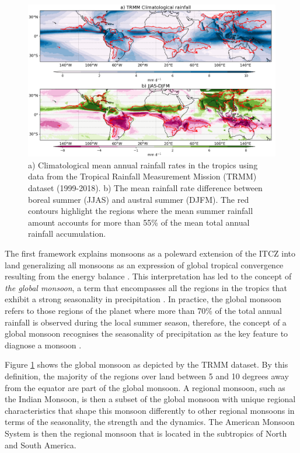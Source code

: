 \begin{figure}[b!]
\includegraphics[width=\linewidth]{figures/trmmclima.png}
\caption[The global monsoon rainfall]{a) Climatological mean annual rainfall rates in the tropics using data from the Tropical Rainfall Measurement Mission (TRMM) dataset (1999-2018). b) The mean rainfall rate difference between boreal summer (JJAS) and austral summer (DJFM). The red contours highlight the regions where the mean summer rainfall amount accounts for more than 55\% of the mean total annual rainfall accumulation. }
\label{fig:monsoon}
\end{figure}


The first framework  explains monsoons as a poleward extension of the ITCZ into land  generalizing all monsoons as an expression of global tropical convergence resulting from the energy balance \citep{chao2001origin,gadgil2018}. This interpretation has led to the concept of \textit{the global monsoon}, a term that encompasses all the regions in the tropics that exhibit a strong seasonality in precipitation \citep{zhou2016,gadgil2018}. 
In practice, the global monsoon refers to those regions of the planet where more than 70\% of the total annual rainfall is observed during the local summer season, therefore, the concept of a global monsoon recognises the seasonality of precipitation as the key feature to diagnose a monsoon \citep{zhou2016,wang2017}.

Figure \ref{fig:monsoon} shows the global monsoon as depicted by the TRMM dataset. By this definition, the majority of the regions over land between 5 and 10 degrees away from the equator are part of the global monsoon.
A regional monsoon, such as the Indian Monsoon, is then a subset of the global monsoon with unique regional characteristics that shape this monsoon differently to other regional monsoons in terms of the seasonality, the strength and the dynamics. 
The American Monsoon System is then the regional monsoon that is located in the subtropics of North and South America. 


